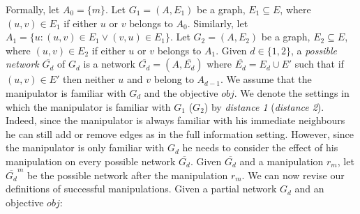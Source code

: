 \documentclass{article}
\begin{document}
Formally, let $A_0 = \{m\}$.
Let $G_1=(A,E_1)$ be a graph, $E_1 \subseteq E$, where $(u,v) \in E_1$ if either $u$ or $v$ belongs to $A_0$.
Similarly, let $A_1 = \{u : (u,v) \in E_1 \lor  (v,u) \in E_1\}$.
Let $G_2=(A,E_2)$ be a graph, $E_2 \subseteq E$, where $(u,v) \in E_2$ if either $u$ or $v$ belongs to $A_1$.
%
%
%
Given $d \in \{1,2\}$, a \emph{possible network} $\overline{G_d}$ of $G_d$ is a network $\overline{G_d}=(A,\overline{E_d})$ where $\overline{E_d} = E_d \cup E'$ such that if $(u,v)\in E'$ then neither $u$ and $v$ belong to $A_{d-1}$.
We assume that the manipulator is familiar with $G_d$ and the objective $obj$.
We denote the settings in which the manipulator is familiar with $G_1$ ($G_2$) by \emph{distance 1} (\emph{distance 2}). 
Indeed, since the manipulator is always familiar with his immediate neighbours he can still add or remove edges as in the full information setting. However, since the manipulator is only familiar with $G_d$ he needs to consider the effect of his manipulation  on every possible network $\overline{G_d}$. Given $\overline{G_d}$ and a manipulation $r_m$, let $\overline{G_d}^m$ be the possible network after the manipulation $r_m$.
We can now revise our definitions of successful manipulations.
Given a partial network $G_d$ and an objective $obj$:
\end{document}

